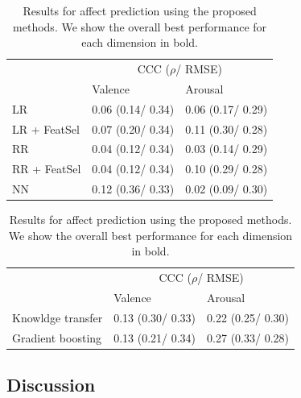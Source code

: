 \documentclass{article}
\begin{document}
\begin{table}[t]
\centering
\caption{Results for affect prediction using the baseline regressors. The best performances for each dimension are shown in bold.}
\begin{tabular}{@{}l|l|l@{}}
\hline
				        & \multicolumn{2}{c}{CCC ($\rho$/ RMSE)}\\ \cline{2-3}
				        & Valence       & Arousal \\ \hline
LR           & 0.06 (0.14/ 0.34) & 0.06 (0.17/ 0.29) \\ 
LR + FeatSel & 0.07 (0.20/ 0.34) & 0.11 (0.30/ 0.28) \\ 
RR           & 0.04 (0.12/ 0.34) & 0.03 (0.14/ 0.29) \\ 
RR + FeatSel & 0.04 (0.12/ 0.34) & 0.10 (0.29/ 0.28) \\ 
NN           & 0.12 (0.36/ 0.33) & 0.02 (0.09/ 0.30) \\ 
\end{tabular}
\label{Baseline_table}
\caption{Results for affect prediction using the proposed methods. We show the overall best performance for each dimension in bold.} 
\begin{tabular}{@{}l|l|l@{}}
\hline
				        & \multicolumn{2}{c}{CCC ($\rho$/ RMSE)}\\ \cline{2-3}
				        & Valence       & Arousal \\ \hline
Knowldge transfer& 0.13 (0.30/ 0.33) & 0.22 (0.25/ 0.30) \\ 
Gradient boosting& 0.13 (0.21/ 0.34) & 0.27 (0.33/ 0.28) \\ 
\end{tabular}
\label{KT_table}
\end{table}

\subsection{Discussion}
\end{document}
